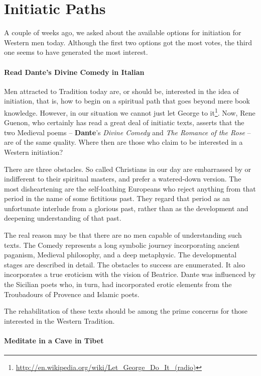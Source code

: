 \section{Initiatic Paths}

A couple of weeks ago, we asked about the available options for initiation for Western men today. Although the first two options got the most votes, the third one seems to have generated the most interest.

\paragraph{Read Dante's Divine Comedy in Italian}


Men attracted to Tradition today are, or should be, interested in the idea of initiation, that is, how to begin on a spiritual path that goes beyond mere book knowledge. However, in our situation we cannot just let George to it\footnote{\url{http://en.wikipedia.org/wiki/Let\_George\_Do\_It\_(radio)}}. Now, Rene Guenon, who certainly has read a great deal of initiatic texts, asserts that the two Medieval poems -- \textbf{Dante}'s \textit{Divine Comedy} and \textit{The Romance of the Rose} -- are of the same quality. Where then are those who claim to be interested in a Western initiation?

There are three obstacles. So called Christians in our day are embarrassed by or indifferent to their spiritual masters, and prefer a watered-down version. The most disheartening are the self-loathing Europeans who reject anything from that period in the name of some fictitious past. They regard that period as an unfortunate interlude from a glorious past, rather than as the development and deepening understanding of that past.

The real reason may be that there are no men capable of understanding such texts. The Comedy represents a long symbolic journey incorporating ancient paganism, Medieval philosophy, and a deep metaphysic. The developmental stages are described in detail. The obstacles to success are enumerated. It also incorporates a true eroticism with the vision of Beatrice. Dante was influenced by the Sicilian poets who, in turn, had incorporated erotic elements from the Troubadours of Provence and Islamic poets.

The rehabilitation of these texts should be among the prime concerns for those interested in the Western Tradition.

\paragraph{Meditate in a Cave in Tibet}


